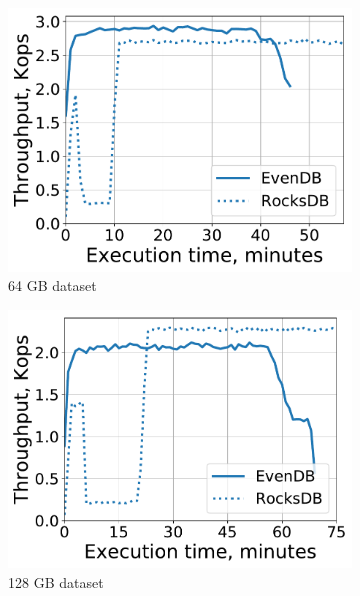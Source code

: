 \begin{figure}[tb]
\centering
\begin{subfigure}{0.29\linewidth}
\includegraphics[width=\textwidth]{figs/throughput_64_scans_10s_line.pdf}
\caption{64 GB dataset}
\label{fig:prod:analytics:a}
\end{subfigure}
\hspace{0.03\linewidth} 
\begin{subfigure}{0.29\linewidth}
\includegraphics[width=\textwidth]{figs/throughput_128_scans_10s_line.pdf}
\caption{128 GB dataset}
\label{fig:prod:analytics:b}
\end{subfigure}
\hspace{0.03\linewidth} 
\begin{subfigure}{0.29\linewidth}

\end{subfigure}
\end{figure}
